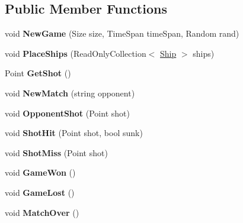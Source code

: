 \subsection*{Public Member Functions}
\begin{DoxyCompactItemize}
\item 
\hypertarget{class_m_b_c_1_1_bots_1_1_random_bot_a3547fdf31c01dc6946e907a54a24da7e}{void {\bfseries New\-Game} (Size size, Time\-Span time\-Span, Random rand)}\label{class_m_b_c_1_1_bots_1_1_random_bot_a3547fdf31c01dc6946e907a54a24da7e}

\item 
\hypertarget{class_m_b_c_1_1_bots_1_1_random_bot_aa8bffd9cb890f0061686efda7f5613fe}{void {\bfseries Place\-Ships} (Read\-Only\-Collection$<$ \hyperlink{class_m_b_c_1_1_core_1_1_ship}{Ship} $>$ ships)}\label{class_m_b_c_1_1_bots_1_1_random_bot_aa8bffd9cb890f0061686efda7f5613fe}

\item 
\hypertarget{class_m_b_c_1_1_bots_1_1_random_bot_a4bdce7f14e3e9cb4e0c066d8240a764e}{Point {\bfseries Get\-Shot} ()}\label{class_m_b_c_1_1_bots_1_1_random_bot_a4bdce7f14e3e9cb4e0c066d8240a764e}

\item 
\hypertarget{class_m_b_c_1_1_bots_1_1_random_bot_a0a4365d6e3f2100c96776aa9b8771c33}{void {\bfseries New\-Match} (string opponent)}\label{class_m_b_c_1_1_bots_1_1_random_bot_a0a4365d6e3f2100c96776aa9b8771c33}

\item 
\hypertarget{class_m_b_c_1_1_bots_1_1_random_bot_a3414498efd36aeadba60cabde19466b9}{void {\bfseries Opponent\-Shot} (Point shot)}\label{class_m_b_c_1_1_bots_1_1_random_bot_a3414498efd36aeadba60cabde19466b9}

\item 
\hypertarget{class_m_b_c_1_1_bots_1_1_random_bot_ad7212214b2a50863d41b9dbefd71e51d}{void {\bfseries Shot\-Hit} (Point shot, bool sunk)}\label{class_m_b_c_1_1_bots_1_1_random_bot_ad7212214b2a50863d41b9dbefd71e51d}

\item 
\hypertarget{class_m_b_c_1_1_bots_1_1_random_bot_aae077027406736b2097d7b778cde90fa}{void {\bfseries Shot\-Miss} (Point shot)}\label{class_m_b_c_1_1_bots_1_1_random_bot_aae077027406736b2097d7b778cde90fa}

\item 
\hypertarget{class_m_b_c_1_1_bots_1_1_random_bot_ac782e5e79375861b37e323f43e109862}{void {\bfseries Game\-Won} ()}\label{class_m_b_c_1_1_bots_1_1_random_bot_ac782e5e79375861b37e323f43e109862}

\item 
\hypertarget{class_m_b_c_1_1_bots_1_1_random_bot_a6c6bf2d1f760ca43f26fce92c3be5762}{void {\bfseries Game\-Lost} ()}\label{class_m_b_c_1_1_bots_1_1_random_bot_a6c6bf2d1f760ca43f26fce92c3be5762}

\item 
\hypertarget{class_m_b_c_1_1_bots_1_1_random_bot_a1fed13a8154ba2b63f76abf85a60f782}{void {\bfseries Match\-Over} ()}\label{class_m_b_c_1_1_bots_1_1_random_bot_a1fed13a8154ba2b63f76abf85a60f782}

\end{DoxyCompactItemize}
